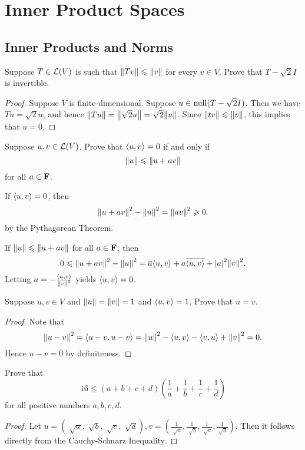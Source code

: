 \chapter{Inner Product Spaces}

\section{Inner Products and Norms}

\begin{exercise}{5}
	Suppose $T \in \operatorname{\mathcal{L}}(V)$ is such that $\norm{Tv} \le \norm{v}$ for every $v \in V$. Prove that $T-\sqrt{2}I$ is invertible.
\end{exercise}

\begin{proof}
	Suppose $V$ is finite-dimensional. Suppose $u \in \operatorname{null}(T - \sqrt{2}I)$. Then we have $Tu = \sqrt{2}u$, and hence $\norm{Tu} = \norm{\sqrt{2}u} = \sqrt{2}\norm{u}$. Since $\norm{tv} \le \norm{v}$, this implies that $u = 0$.
\end{proof}

\begin{exercise}{6}
	Suppose $u, v \in \operatorname{\mathcal{L}}(V)$. Prove that $\inp{u}{v} = 0$ if and only if
	\[
		\norm{u} \le \norm{u + av}
	\]
	for all $a \in \mathbf{F}$.
\end{exercise}

\begin{solution}
	If $\inp{u}{v} = 0$, then
	\[
		\norm{u + av}^{2} - \norm{u}^{2} = \norm{av}^{2} \ge 0.
	\]
	by the Pythagorean Theorem.

	If $\norm{u} \le \norm{u + av}$ for all $a \in \mathbf{F}$, then
	\[
		0 \le \norm{u + av}^{2} - \norm{u}^{2} = \conj{a}\inp{u}{v} + a\conj{\inp{u}{v}} + \abs{a}^{2}\norm{v}^{2}.
	\]
	Letting $a = -\frac{\inp{u}{v}}{\norm{v}^{2}}$ yields $\inp{u}{v} = 0$.
\end{solution}

\begin{exercise}{8}
	Suppose $u, v \in V$ and $\norm{u} = \norm{v} = 1$ and $\inp{u}{v} = 1$. Prove that $u = v$.
\end{exercise}

\begin{proof}
	Note that
	\[
		\norm{u - v}^{2} = \inp{u - v}{u - v} = \norm{u}^{2} - \inp{u}{v} - \inp{v}{u} + \norm{v}^{2} = 0.
	\]
	Hence $u - v = 0$ by definiteness.
\end{proof}

\begin{exercise}{11}
	Prove that
	\[
		16 \le (a + b + c + d)\left(\frac{1}{a} + \frac{1}{b} + \frac{1}{c} + \frac{1}{d}\right)
	\]
	for all positive numbers $a, b, c, d$.
\end{exercise}

\begin{proof}
	Let $u = \left(\sqrt[]{a}, \sqrt[]{b}, \sqrt[]{c}, \sqrt[]{d}\right), v = \left(\frac{1}{\sqrt[]{a}}, \frac{1}{\sqrt[]{b}}, \frac{1}{\sqrt[]{c}}, \frac{1}{\sqrt[]{d}}\right)$. Then it follows directly from the Cauchy-Schuarz Inequality.
\end{proof}
